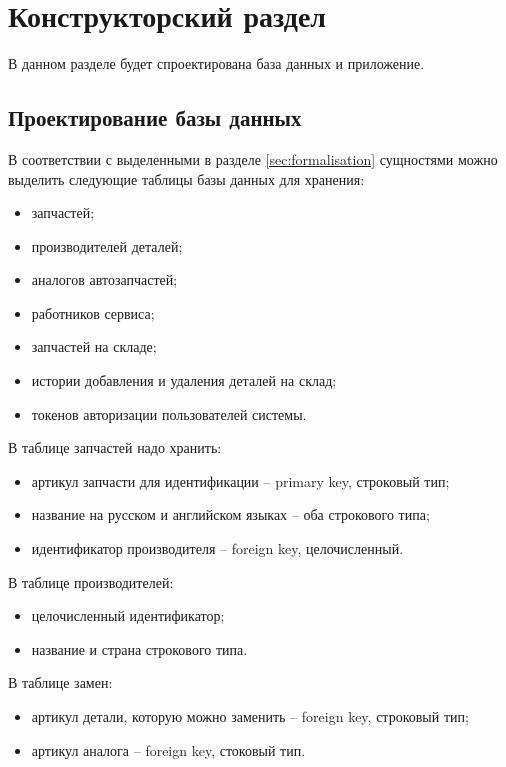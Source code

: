 \chapter{Конструкторский раздел}

В данном разделе будет спроектирована база данных и приложение.

\section{Проектирование базы данных}

В соответствии с выделенными в разделе \ref{sec:formalisation} сущностями можно выделить следующие таблицы базы данных для хранения:
\begin{itemize}
	\item запчастей;
	\item производителей деталей;
	\item аналогов автозапчастей;
	\item работников сервиса;
	\item запчастей на складе;
	\item истории добавления и удаления деталей на склад;
	\item токенов авторизации пользователей системы.
\end{itemize}

В таблице запчастей надо хранить:
\begin{itemize}
	\item артикул запчасти для идентификации -- primary key, строковый тип;
	\item название на русском и английском языках -- оба строкового типа;
	\item идентификатор производителя -- foreign key, целочисленный.
\end{itemize}

В таблице производителей:
\begin{itemize}
	\item целочисленный идентификатор;
	\item название и страна строкового типа.
\end{itemize}

В таблице замен:
\begin{itemize}
	\item артикул детали, которую можно заменить -- foreign key, строковый тип;
	\item артикул аналога -- foreign key, стоковый тип.
\end{itemize}

